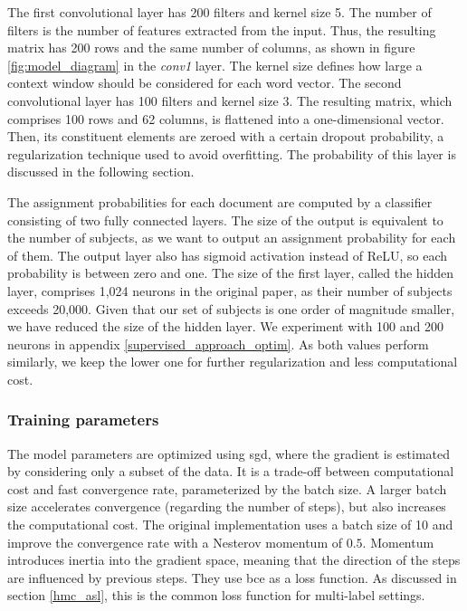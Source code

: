 The first convolutional layer has 200 filters and kernel size 5. The number of filters is the number of features extracted from the input. Thus, the resulting matrix has 200 rows and the same number of columns, as shown in figure \ref{fig:model_diagram} in the \textit{conv1} layer. The kernel size defines how large a context window should be considered for each word vector. The second convolutional layer has 100 filters and kernel size 3. The resulting matrix, which comprises 100 rows and 62 columns, is flattened into a one-dimensional vector. Then, its constituent elements are zeroed with a certain dropout probability, a regularization technique used to avoid overfitting. The probability of this layer is discussed in the following section.

The assignment probabilities for each document are computed by a classifier consisting of two fully connected layers. The size of the output is equivalent to the number of subjects, as we want to output an assignment probability for each of them. The output layer also has sigmoid activation instead of ReLU, so each probability is between zero and one. The size of the first layer, called the hidden layer, comprises 1,024 neurons in the original paper, as their number of subjects exceeds 20,000. Given that our set of subjects is one order of magnitude smaller, we have reduced the size of the hidden layer. We experiment with 100 and 200 neurons in appendix \ref{supervised_approach_optim}. As both values perform similarly, we keep the lower one for further regularization and less computational cost.

\subsubsection{Training parameters} \label{supervised_approach_params}

The model parameters are optimized using \acrfull{sgd}, where the gradient is estimated by considering only a subset of the data. It is a trade-off between computational cost and fast convergence rate, parameterized by the batch size. A larger batch size accelerates convergence (regarding the number of steps), but also increases the computational cost. The original implementation uses a batch size of 10 and improve the convergence rate with a Nesterov momentum of $0.5$. Momentum introduces inertia into the gradient space, meaning that the direction of the steps are influenced by previous steps. They use \acrfull{bce} as a loss function. As discussed in section \ref{hmc_asl}, this is the common loss function for multi-label settings.

